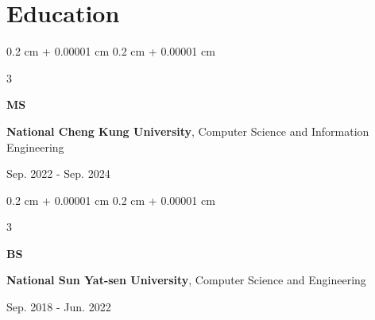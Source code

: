 \documentclass[11pt, letterpaper]{article}
\newenvironment{highlights}{
    \begin{itemize}[
        topsep=0.10 cm,
        parsep=0.10 cm,
        partopsep=0pt,
        itemsep=0pt,
        leftmargin=0.4 cm + 10pt
    ]
}{
    \end{itemize}
} %
\newenvironment{highlightsforbulletentries}{
    \begin{itemize}[
        topsep=0.10 cm,
        parsep=0.10 cm,
        partopsep=0pt,
        itemsep=0pt,
        leftmargin=10pt
    ]
}{
    \end{itemize}
} %
\newenvironment{onecolentry}{
    \begin{adjustwidth}{
        0.2 cm + 0.00001 cm
    }{
        0.2 cm + 0.00001 cm
    }
}{
    \end{adjustwidth}
} %
\newenvironment{threecolentry}[3][]{
    \onecolentry
    \def\thirdColumn{#3}
    \setcolumnwidth{1.2 cm, \fill, 4 cm}
    \begin{paracol}{3}
    {\raggedright #2} \switchcolumn
}{
    \switchcolumn \raggedleft \thirdColumn
    \end{paracol}
    \endonecolentry
} %
\let\hrefWithoutArrow\href
\renewcommand{\href}[2]{\hrefWithoutArrow{#1}{\ifthenelse{\equal{#2}{}}{ }{#2 }\raisebox{.15ex}{\footnotesize \faExternalLink*}}}
\begin{document}









\section{Education}


\begin{threecolentry}{
        \textbf{MS}
    }{
        Sep. 2022 - Sep. 2024
    }
    \textbf{National Cheng Kung University}, Computer Science and Information Engineering
\end{threecolentry}


\begin{threecolentry}{
        \textbf{BS}
    }{
        Sep. 2018 - Jun. 2022
    }
    \textbf{National Sun Yat-sen University}, Computer Science and Engineering
\end{threecolentry}
\end{document}
